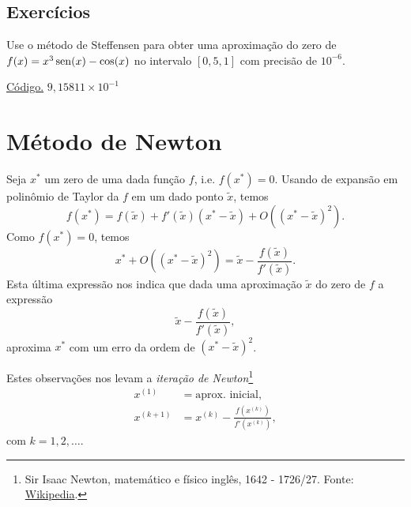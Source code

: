 \subsection*{Exercícios}

\begin{exer}\label{exer:Steffensen_1}
  Use o método de Steffensen para obter uma aproximação do zero de $f(x)=x^3\operatorname{sen}(x)-\cos(x)$ no intervalo $[0,5, 1]$ com precisão de $10^{-6}$.
\end{exer}
\begin{resp}
    \ifisoctave 
    \href{https://github.com/phkonzen/notas/blob/master/src/MatematicaNumerica/cap_eq1d/dados/exer_Steffensen_1/exer_Steffensen_1.m}{Código.} 
    \fi
    $9,15811\times 10^{-1}$
\end{resp}

\section{Método de Newton}\label{cap_mef1d_sec_newton}

Seja $x^*$ um zero de uma dada função $f$, i.e. $f(x^*)=0$. Usando de expansão em polinômio de Taylor da $f$ em um dado ponto $\tilde{x}$, temos
\begin{equation}
  f(x^*) = f(\tilde{x}) + f'(\tilde{x})(x^*-\tilde{x}) + O((x^*-\tilde{x})^2).
\end{equation}
Como $f(x^*)=0$, temos
\begin{equation}
  x^* + O((x^*-\tilde{x})^2) = \tilde{x} - \frac{f(\tilde{x})}{f'(\tilde{x})}.
\end{equation}
Esta última expressão nos indica que dada uma aproximação $\tilde{x}$ do zero de $f$ a expressão
\begin{equation}
  \tilde{x} - \frac{f(\tilde{x})}{f'(\tilde{x})},
\end{equation}
aproxima $x^*$ com um erro da ordem de $(x^*-\tilde{x})^2$.

Estes observações nos levam a \emph{iteração de Newton}\footnote{Sir Isaac Newton, matemático e físico inglês, 1642 - 1726/27. Fonte: \href{https://en.wikipedia.org/wiki/Isaac_Newton}{Wikipedia}.}
\begin{align}
  x^{(1)} &= \text{aprox. inicial},\\
  x^{(k+1)} &= x^{(k)} - \frac{f(x^{(k)})}{f'(x^{(k)})},\label{eq:Newton_iteracao}
\end{align}
com $k=1, 2, \ldots$.

